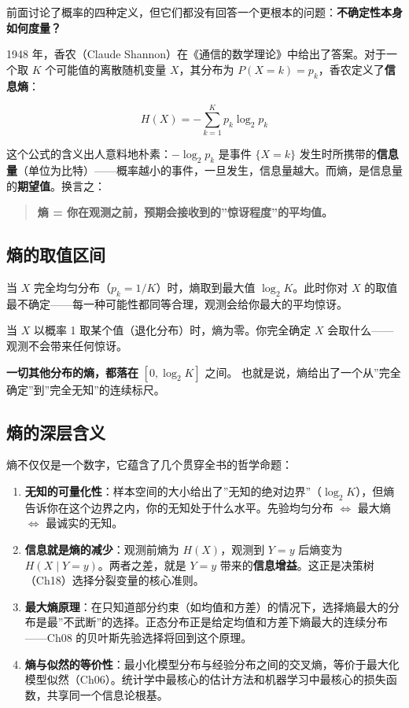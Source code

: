 \documentclass[
]{book}
\begin{document}
前面讨论了概率的四种定义，但它们都没有回答一个更根本的问题：\textbf{不确定性本身如何度量？}

1948 年，香农（Claude Shannon）在《通信的数学理论》中给出了答案。对于一个取 \(K\) 个可能值的离散随机变量 \(X\)，其分布为 \(P(X = k) = p_k\)，香农定义了\textbf{信息熵}：

\[H(X) = -\sum_{k=1}^{K} p_k \log_2 p_k\]

这个公式的含义出人意料地朴素：\(-\log_2 p_k\) 是事件 \(\{X = k\}\) 发生时所携带的\textbf{信息量}（单位为比特）------概率越小的事件，一旦发生，信息量越大。而熵，是信息量的\textbf{期望值}。换言之：

\begin{quote}
\textbf{熵 = 你在观测之前，预期会接收到的''惊讶程度''的平均值。}
\end{quote}

\subsection{熵的取值区间}\label{ux71b5ux7684ux53d6ux503cux533aux95f4}

当 \(X\) 完全均匀分布（\(p_k = 1/K\)）时，熵取到最大值 \(\log_2 K\)。此时你对 \(X\) 的取值最不确定------每一种可能性都同等合理，观测会给你最大的平均惊讶。

当 \(X\) 以概率 1 取某个值（退化分布）时，熵为零。你完全确定 \(X\) 会取什么------观测不会带来任何惊讶。

\textbf{一切其他分布的熵，都落在} \([0, \log_2 K]\) 之间。 也就是说，熵给出了一个从''完全确定''到''完全无知''的连续标尺。

\subsection{熵的深层含义}\label{ux71b5ux7684ux6df1ux5c42ux542bux4e49}

熵不仅仅是一个数字，它蕴含了几个贯穿全书的哲学命题：

\begin{enumerate}
\def\labelenumi{\arabic{enumi}.}
\item
  \textbf{无知的可量化性}：样本空间的大小给出了''无知的绝对边界''（\(\log_2 K\)），但熵告诉你在这个边界之内，你的无知处于什么水平。先验均匀分布 \(\Leftrightarrow\) 最大熵 \(\Leftrightarrow\) 最诚实的无知。
\item
  \textbf{信息就是熵的减少}：观测前熵为 \(H(X)\)，观测到 \(Y=y\) 后熵变为 \(H(X \mid Y=y)\)。两者之差，就是 \(Y=y\) 带来的\textbf{信息增益}。这正是决策树（Ch18）选择分裂变量的核心准则。
\item
  \textbf{最大熵原理}：在只知道部分约束（如均值和方差）的情况下，选择熵最大的分布是最''不武断''的选择。正态分布正是给定均值和方差下熵最大的连续分布------Ch08 的贝叶斯先验选择将回到这个原理。
\item
  \textbf{熵与似然的等价性}：最小化模型分布与经验分布之间的交叉熵，等价于最大化模型似然（Ch06）。统计学中最核心的估计方法和机器学习中最核心的损失函数，共享同一个信息论根基。
\end{enumerate}
\end{document}
